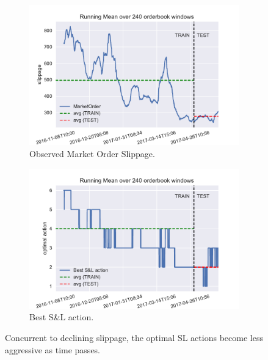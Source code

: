 \begin{figure}[ht]
	\centering
	\begin{subfigure}[b]{0.5\textwidth}
        		\centering
        		\includegraphics[width=\textwidth]{content/drawings/runningMean240_MarketPrice}
        		\caption{Observed Market Order Slippage.}
		\label{fig:runningmean:marketPrice}
    	\end{subfigure}%
	\begin{subfigure}[b]{0.5\textwidth}
        		\centering
        		\includegraphics[width=\textwidth]{content/drawings/runningMean240_bestAction}
        		\caption{Best S\&L action.}
		\label{fig:runningmean:bestaction}
    	\end{subfigure}

	\caption{Concurrent to declining slippage, the optimal \ac{SL} actions become less aggressive as time passes.}
	\label{fig:runningmean}
\end{figure}


